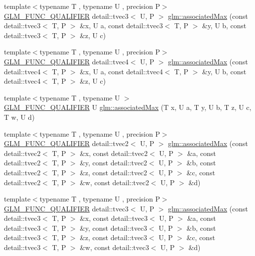 \begin{DoxyCompactItemize}
\item 
{\footnotesize template$<$typename T , typename U , precision P$>$ }\\\hyperlink{setup_8hpp_a33fdea6f91c5f834105f7415e2a64407}{G\+L\+M\+\_\+\+F\+U\+N\+C\+\_\+\+Q\+U\+A\+L\+I\+F\+I\+ER} detail\+::tvec3$<$ U, P $>$ \hyperlink{namespaceglm_a95d56ed7aac4ce11096a2dd02b1ee085}{glm\+::associated\+Max} (const detail\+::tvec3$<$ T, P $>$ \&x, U a, const detail\+::tvec3$<$ T, P $>$ \&y, U b, const detail\+::tvec3$<$ T, P $>$ \&z, U c)
\item 
{\footnotesize template$<$typename T , typename U , precision P$>$ }\\\hyperlink{setup_8hpp_a33fdea6f91c5f834105f7415e2a64407}{G\+L\+M\+\_\+\+F\+U\+N\+C\+\_\+\+Q\+U\+A\+L\+I\+F\+I\+ER} detail\+::tvec4$<$ U, P $>$ \hyperlink{namespaceglm_a7ccec1a3ebac248a4fc02c0cd62e455a}{glm\+::associated\+Max} (const detail\+::tvec4$<$ T, P $>$ \&x, U a, const detail\+::tvec4$<$ T, P $>$ \&y, U b, const detail\+::tvec4$<$ T, P $>$ \&z, U c)
\item 
{\footnotesize template$<$typename T , typename U $>$ }\\\hyperlink{setup_8hpp_a33fdea6f91c5f834105f7415e2a64407}{G\+L\+M\+\_\+\+F\+U\+N\+C\+\_\+\+Q\+U\+A\+L\+I\+F\+I\+ER} U \hyperlink{namespaceglm_a7ec2c4ed91faef109efef1465ca65ca4}{glm\+::associated\+Max} (T x, U a, T y, U b, T z, U c, T w, U d)
\item 
{\footnotesize template$<$typename T , typename U , precision P$>$ }\\\hyperlink{setup_8hpp_a33fdea6f91c5f834105f7415e2a64407}{G\+L\+M\+\_\+\+F\+U\+N\+C\+\_\+\+Q\+U\+A\+L\+I\+F\+I\+ER} detail\+::tvec2$<$ U, P $>$ \hyperlink{namespaceglm_ac54fada650fc6c4aef1745df3e1f05c8}{glm\+::associated\+Max} (const detail\+::tvec2$<$ T, P $>$ \&x, const detail\+::tvec2$<$ U, P $>$ \&a, const detail\+::tvec2$<$ T, P $>$ \&y, const detail\+::tvec2$<$ U, P $>$ \&b, const detail\+::tvec2$<$ T, P $>$ \&z, const detail\+::tvec2$<$ U, P $>$ \&c, const detail\+::tvec2$<$ T, P $>$ \&w, const detail\+::tvec2$<$ U, P $>$ \&d)
\item 
{\footnotesize template$<$typename T , typename U , precision P$>$ }\\\hyperlink{setup_8hpp_a33fdea6f91c5f834105f7415e2a64407}{G\+L\+M\+\_\+\+F\+U\+N\+C\+\_\+\+Q\+U\+A\+L\+I\+F\+I\+ER} detail\+::tvec3$<$ U, P $>$ \hyperlink{namespaceglm_a94f2f1b29419c238982bc7148e3e0d6d}{glm\+::associated\+Max} (const detail\+::tvec3$<$ T, P $>$ \&x, const detail\+::tvec3$<$ U, P $>$ \&a, const detail\+::tvec3$<$ T, P $>$ \&y, const detail\+::tvec3$<$ U, P $>$ \&b, const detail\+::tvec3$<$ T, P $>$ \&z, const detail\+::tvec3$<$ U, P $>$ \&c, const detail\+::tvec3$<$ T, P $>$ \&w, const detail\+::tvec3$<$ U, P $>$ \&d)

\end{DoxyCompactItemize}

